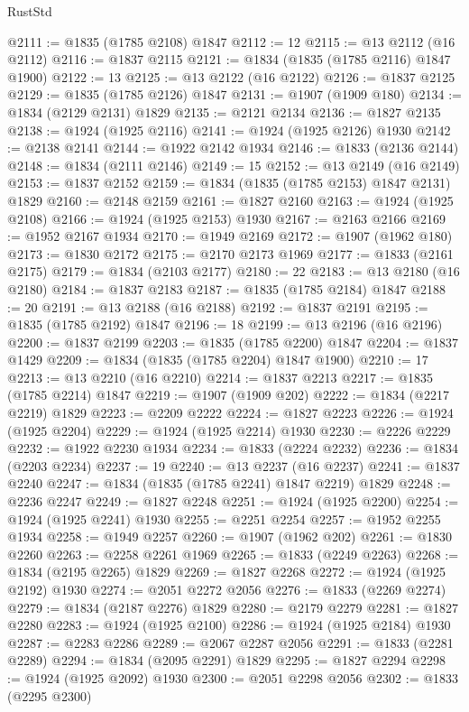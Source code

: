 \begin{lexlean}{RustStd}
\begin{coremodule}
@2111 := @1835 (@1785 @2108) @1847
@2112 := 12
@2115 := @13 @2112 (@16 @2112)
@2116 := @1837 @2115
@2121 := @1834 (@1835 (@1785 @2116) @1847 @1900)
@2122 := 13
@2125 := @13 @2122 (@16 @2122)
@2126 := @1837 @2125
@2129 := @1835 (@1785 @2126) @1847
@2131 := @1907 (@1909 @180)
@2134 := @1834 (@2129 @2131) @1829
@2135 := @2121 @2134
@2136 := @1827 @2135
@2138 := @1924 (@1925 @2116)
@2141 := @1924 (@1925 @2126) @1930
@2142 := @2138 @2141
@2144 := @1922 @2142 @1934
@2146 := @1833 (@2136 @2144)
@2148 := @1834 (@2111 @2146)
@2149 := 15
@2152 := @13 @2149 (@16 @2149)
@2153 := @1837 @2152
@2159 := @1834 (@1835 (@1785 @2153) @1847 @2131) @1829
@2160 := @2148 @2159
@2161 := @1827 @2160
@2163 := @1924 (@1925 @2108)
@2166 := @1924 (@1925 @2153) @1930
@2167 := @2163 @2166
@2169 := @1952 @2167 @1934
@2170 := @1949 @2169
@2172 := @1907 (@1962 @180)
@2173 := @1830 @2172
@2175 := @2170 @2173 @1969
@2177 := @1833 (@2161 @2175)
@2179 := @1834 (@2103 @2177)
@2180 := 22
@2183 := @13 @2180 (@16 @2180)
@2184 := @1837 @2183
@2187 := @1835 (@1785 @2184) @1847
@2188 := 20
@2191 := @13 @2188 (@16 @2188)
@2192 := @1837 @2191
@2195 := @1835 (@1785 @2192) @1847
@2196 := 18
@2199 := @13 @2196 (@16 @2196)
@2200 := @1837 @2199
@2203 := @1835 (@1785 @2200) @1847
@2204 := @1837 @1429
@2209 := @1834 (@1835 (@1785 @2204) @1847 @1900)
@2210 := 17
@2213 := @13 @2210 (@16 @2210)
@2214 := @1837 @2213
@2217 := @1835 (@1785 @2214) @1847
@2219 := @1907 (@1909 @202)
@2222 := @1834 (@2217 @2219) @1829
@2223 := @2209 @2222
@2224 := @1827 @2223
@2226 := @1924 (@1925 @2204)
@2229 := @1924 (@1925 @2214) @1930
@2230 := @2226 @2229
@2232 := @1922 @2230 @1934
@2234 := @1833 (@2224 @2232)
@2236 := @1834 (@2203 @2234)
@2237 := 19
@2240 := @13 @2237 (@16 @2237)
@2241 := @1837 @2240
@2247 := @1834 (@1835 (@1785 @2241) @1847 @2219) @1829
@2248 := @2236 @2247
@2249 := @1827 @2248
@2251 := @1924 (@1925 @2200)
@2254 := @1924 (@1925 @2241) @1930
@2255 := @2251 @2254
@2257 := @1952 @2255 @1934
@2258 := @1949 @2257
@2260 := @1907 (@1962 @202)
@2261 := @1830 @2260
@2263 := @2258 @2261 @1969
@2265 := @1833 (@2249 @2263)
@2268 := @1834 (@2195 @2265) @1829
@2269 := @1827 @2268
@2272 := @1924 (@1925 @2192) @1930
@2274 := @2051 @2272 @2056
@2276 := @1833 (@2269 @2274)
@2279 := @1834 (@2187 @2276) @1829
@2280 := @2179 @2279
@2281 := @1827 @2280
@2283 := @1924 (@1925 @2100)
@2286 := @1924 (@1925 @2184) @1930
@2287 := @2283 @2286
@2289 := @2067 @2287 @2056
@2291 := @1833 (@2281 @2289)
@2294 := @1834 (@2095 @2291) @1829
@2295 := @1827 @2294
@2298 := @1924 (@1925 @2092) @1930
@2300 := @2051 @2298 @2056
@2302 := @1833 (@2295 @2300)

\end{coremodule}
\end{lexlean}
